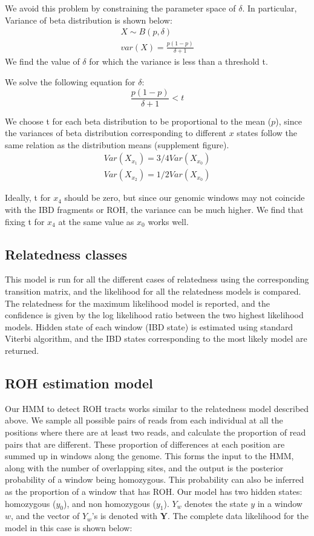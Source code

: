 \documentclass[12pt, letterpaper]{article}
\begin{document}
We avoid this problem by constraining the parameter space of $\delta$. 
In particular, 
Variance of beta distribution is shown below:
\begin{align}
    X \sim B(p,\delta)\\
    var(X) = \frac{p(1-p)}{\delta + 1}
\end{align}
We find the value of $\delta$ for which the variance is less than a threshold t.

We solve the following equation for $\delta$:
\begin{equation}
    \frac{p(1-p)}{\delta + 1}  < t
\end{equation}

We choose t for each beta distribution to be proportional to the mean ($p$), since the variances of beta distribution corresponding to different $x$ states follow the same relation as the distribution means (supplement figure). 
\begin{align}
    Var(X_{x_1}) = 3/4 Var(X_{x_0})\\
    Var(X_{x_2}) = 1/2 Var(X_{x_0})
\end{align}


Ideally, t for $x_4$ should be zero, but since our genomic windows may not coincide with the IBD fragments or ROH, the variance can be much higher. We find that fixing t for $x_4$ at the same value as $x_0$ works well.



\subsection{Relatedness classes}
This model is run for all the different cases of relatedness using the corresponding transition matrix, and the likelihood for all the relatedness models is compared. The relatedness for the maximum likelihood model is reported, and the confidence is given by the log likelihood ratio between the two highest likelihood models.  
Hidden state of each window (IBD state) is estimated using standard Viterbi algorithm, and the IBD states corresponding to the most likely model are returned. 



\subsection{ROH estimation model}

Our HMM to detect ROH tracts works similar to the relatedness model described above. We sample all possible pairs of reads from each individual at all the positions where there are at least two reads, and calculate the proportion of read pairs that are different. These proportion of differences at each position are summed up in windows along the genome. This forms the input to the HMM, along with the number of overlapping sites, and the output is the posterior probability of a window being homozygous. This probability can also be inferred as the proportion of a window that has ROH. Our model has two hidden states: homozygous ($y_0$), and non homozygous ($y_1$). $Y_w$ denotes the state $y$ in a window $w$, and the vector of $Y_w$'s is denoted with $\mathbf{Y}$. The complete data likelihood for the model in this case is shown below:
\end{document}

